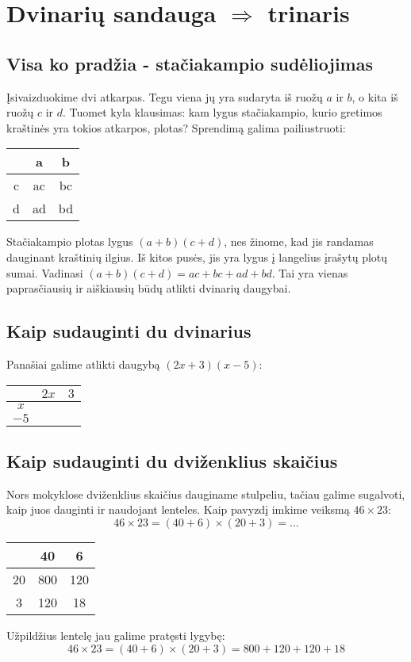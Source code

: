\documentclass[a4paper]{article}
\newcommand{\high}[1]{\cellcolor{orange!80!white}{#1}}
\newcommand{\midd}[1]{\cellcolor{green!50!white}{#1}}
\newcommand{\low}[1]{\cellcolor{blue!50!white}{#1}}
\begin{document}
\section{Dvinarių sandauga $\Rightarrow$ trinaris}
\subsection{Visa ko pradžia - stačiakampio sudėliojimas}
Įsivaizduokime dvi atkarpas. Tegu viena jų yra sudaryta iš ruožų $a$ ir $b$, o kita iš ruožų $c$ ir $d$. Tuomet kyla klausimas: kam lygus stačiakampio, kurio gretimos kraštinės yra tokios atkarpos, plotas? Sprendimą galima pailiustruoti:

\begin{center}
\begin{tabular}{c||c|c}
 & a & b \\ \hline \hline
 c & ac & bc\\ \hline 
 d & ad &bd
\end{tabular}
\end{center}

Stačiakampio plotas lygus $(a + b)(c + d)$, nes žinome, kad jis randamas dauginant kraštinių ilgius. Iš kitos pusės, jis yra lygus į langelius įrašytų plotų sumai. Vadinasi $(a + b)(c + d) = ac + bc + ad + bd$. Tai yra vienas paprasčiausių ir aiškiausių būdų atlikti dvinarių daugybai.
\subsection{Kaip sudauginti du dvinarius}
Panašiai galime atlikti daugybą $(2x+3)(x-5)$:

\begin{center}
\begin{tabular}{c||c|c}
 & $2x$ & $3$ \\ \hline \hline
 $x$ & \high{$2x^2$} & \midd{$3x$}\\ \hline 
 $-5$ & \midd{$-10x$} & \low{$-15$}
\end{tabular}
\end{center}

\subsection{Kaip sudauginti du dviženklius skaičius}
Nors mokyklose dviženklius skaičius dauginame stulpeliu, tačiau galime sugalvoti, kaip juos dauginti ir naudojant lenteles.
Kaip pavyzdį imkime veiksmą $46\times 23$:
$$46\times 23 = (40 + 6)\times (20 + 3) = \dots$$
\begin{center}
\begin{tabular}{c||c|c}
 & 40 & 6 \\ \hline \hline
 20 & 800 & 120\\ \hline 
 3 & 120 & 18
\end{tabular}
\end{center}
Užpildžius lentelę jau galime pratęsti lygybę:
$$46\times 23 = (40 + 6)\times (20 + 3) = 800+120+120+18$$
\end{document}
